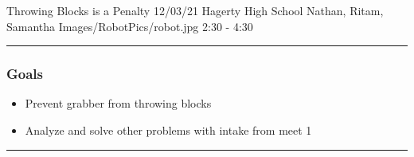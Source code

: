 \insertmeeting 
	{Throwing Blocks is a Penalty} 
	{12/03/21} 
	{Hagerty High School}
	{Nathan, Ritam, Samantha}
	{Images/RobotPics/robot.jpg}
	{2:30 - 4:30}
	
\noindent\hfil\rule{\textwidth}{.4pt}\hfil
\subsubsection*{Goals}
\begin{itemize}
    \item Prevent grabber from throwing blocks
    \item Analyze and solve other problems with intake from meet 1
   

\end{itemize} 

\noindent\hfil\rule{\textwidth}{.4pt}\hfil

